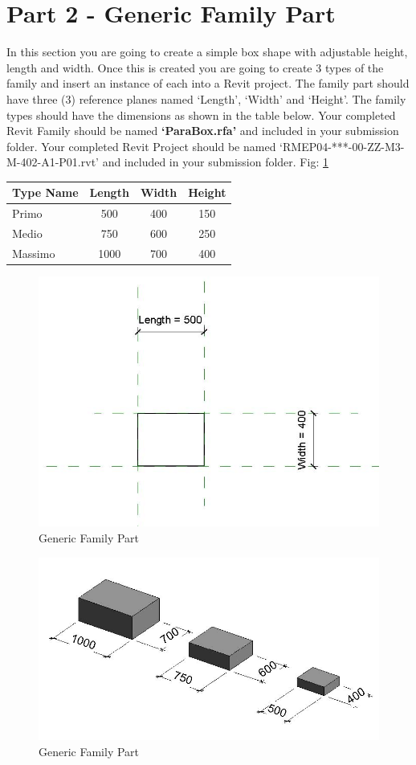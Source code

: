 \newpage


\section*{Part 2 - Generic Family Part}
In this section you are going to create a simple box shape with adjustable height, length and width. Once this is created you are going to create 3 types of the family and insert an instance of each into a Revit project. The family part should have three (3) reference planes named ‘Length’, ‘Width’ and ‘Height’. The family types should have the dimensions as shown in the table below.  Your completed Revit Family should be named \textbf{‘ParaBox.rfa’} and included in your submission folder.  Your completed Revit Project should be named ‘RMEP04-***-00-ZZ-M3-M-402-A1-P01.rvt’ and included in your submission folder. Fig: \ref{fig:GenericFamilyPart1}\\


\begin{tabularx}{\textwidth}{ |X|c|c|c| }
	\hline
	\textbf{Type Name} & Length & Width & Height \\
	\hline 
	Primo & 500 & 400 & 150\\
	Medio & 750 & 600 & 250\\
	Massimo & 1000 & 700 & 400\\
	\hline
\end{tabularx}


\begin{figure}[h]
	\centering
	\includegraphics[width=0.7\linewidth]{./SP/img/ParaBox1.jpg}
	\caption{Generic Family Part}
	\label{fig:GenericFamilyPart1}
\end{figure}


\begin{figure}[h]
	\centering
	\includegraphics[width=0.7\linewidth]{./SP/img/ParaBox2.jpg}
	\caption{Generic Family Part}
	\label{fig:GenericFamilyPart2}
\end{figure}


